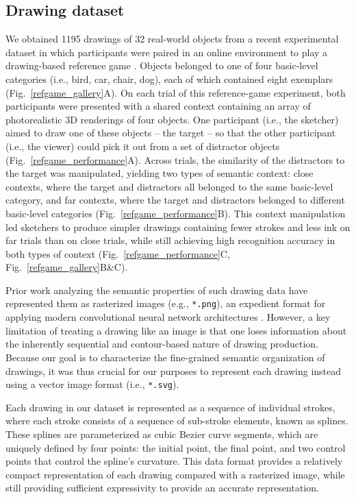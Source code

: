 \documentclass[10pt,letterpaper]{article}
\begin{document}
\subsection{Drawing dataset}
We obtained 1195 drawings of 32 real-world objects from a recent experimental dataset in which participants were paired in an online environment to play a drawing-based reference game \cite{fan2018modeling}.
Objects belonged to one of four basic-level categories (i.e., bird, car, chair, dog), each of which contained eight exemplars (Fig.~\ref{refgame_gallery}A).
On each trial of this reference-game experiment, both participants were presented with a shared context containing an array of photorealistic 3D renderings of four objects.   
One participant (i.e., the sketcher) aimed to draw one of these objects -- the target -- so that the other participant (i.e., the viewer) could pick it out from a set of distractor objects (Fig.~\ref{refgame_performance}A). 
Across trials, the similarity of the distractors to the target was manipulated, yielding two types of semantic context: close contexts, where the target and distractors all belonged to the same basic-level category, and far contexts, where the target and distractors belonged to different basic-level categories (Fig.~\ref{refgame_performance}B). 
This context manipulation led sketchers to produce simpler drawings containing fewer strokes and less ink on far trials than on close trials, while still achieving high recognition accuracy in both types of context (Fig.~\ref{refgame_performance}C, Fig.~\ref{refgame_gallery}B\&C). 
 
Prior work analyzing the semantic properties of such drawing data have represented them as rasterized images (e.g., \texttt{*.png}), an expedient format for applying modern convolutional neural network architectures \cite{FanCommon2018,sangkloy2016sketchy,yu2017sketch}. 
However, a key limitation of treating a drawing like an image is that one loses information about the inherently sequential and contour-based nature of drawing production. 
Because our goal is to characterize the fine-grained semantic organization of drawings, it was thus crucial for our purposes to represent each drawing instead using a vector image format (i.e., \texttt{*.svg}). 

Each drawing in our dataset is represented as a sequence of individual strokes, where each stroke consists of a sequence of sub-stroke elements, known as splines. 
These splines are parameterized as cubic Bezier curve segments, which are uniquely defined by four points: the initial point, the final point, and two control points that control the spline's curvature.
This data format provides a relatively compact representation of each drawing compared with a rasterized image, while still providing sufficient expressivity to provide an accurate representation. 
\end{document}
